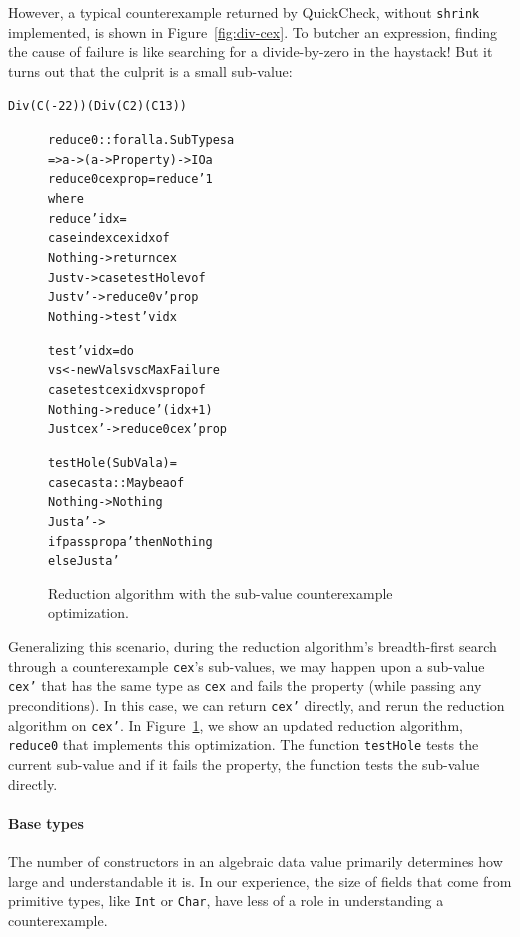 \documentclass[10pt]{sigplanconf}
\newenvironment{code}{\begin{alltt}}{\end{alltt}}
\newcommand{\ttp}[1]{\texttt{#1}}
\begin{document}
However, a typical counterexample returned by QuickCheck, without \ttp{shrink}
implemented, is shown in Figure~\ref{fig:div-cex}.  To butcher an expression,
finding the cause of failure is like searching for a divide-by-zero in the
haystack!  But it turns out that the culprit is a small sub-value:
%
\begin{code}
Div (C (-22)) (Div (C 2) (C 13))
\end{code}
%

\begin{figure}
\begin{code}
reduce0 :: forall a . SubTypes a
        => a -> (a -> Property) -> IO a
reduce0 cex prop = reduce' 1
  where
  reduce' idx =
    case index cex idx of
      Nothing -> return cex
      Just v  -> case testHole v of
                   Just v' -> reduce0 v' prop
                   Nothing -> test' v idx

  test' v idx = do
    vs <- newVals v scMaxFailure
    case test cex idx vs prop of
      Nothing   -> reduce' (idx+1)
      Just cex' -> reduce0 cex' prop

  testHole (SubVal a) =
    case cast a :: Maybe a of
      Nothing -> Nothing
      Just a' ->
        if pass prop a' then Nothing
          else Just a'
\end{code}
  \caption{Reduction algorithm with the sub-value counterexample optimization.}
  \label{fig:reduce0}
\end{figure}

Generalizing this scenario, during the reduction algorithm's breadth-first
search through a counterexample \ttp{cex}'s sub-values, we may happen upon a
sub-value \ttp{cex'} that has the same type as \ttp{cex} and fails the property
(while passing any preconditions).  In this case, we can return \ttp{cex'}
directly, and rerun the reduction algorithm on \ttp{cex'}.  In
Figure~\ref{fig:reduce0}, we show an updated reduction algorithm, \ttp{reduce0}
that implements this optimization.  The function \ttp{testHole} tests the
current sub-value and if it fails the property, the function tests the sub-value
directly.

\paragraph{Base types}

The number of constructors in an algebraic data value primarily determines how
large and understandable it is.  In our experience, the size of fields that come
from primitive types, like \ttp{Int} or \ttp{Char}, have less of a role in
understanding a counterexample.
\end{document}
